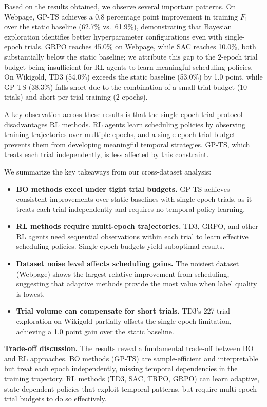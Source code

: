 \documentclass[11pt]{article}
\begin{document}
Based on the results obtained, we observe several important patterns. On Webpage, GP-TS achieves a 0.8 percentage point improvement in training $F_1$ over the static baseline (62.7\% vs.\ 61.9\%), demonstrating that Bayesian exploration identifies better hyperparameter configurations even with single-epoch trials. GRPO reaches 45.0\% on Webpage, while SAC reaches 10.0\%, both substantially below the static baseline; we attribute this gap to the 2-epoch trial budget being insufficient for RL agents to learn meaningful scheduling policies. On Wikigold, TD3 (54.0\%) exceeds the static baseline (53.0\%) by 1.0 point, while GP-TS (38.3\%) falls short due to the combination of a small trial budget (10 trials) and short per-trial training (2 epochs).

A key observation across these results is that the single-epoch trial protocol disadvantages RL methods. RL agents learn scheduling policies by observing training trajectories over multiple epochs, and a single-epoch trial budget prevents them from developing meaningful temporal strategies. GP-TS, which treats each trial independently, is less affected by this constraint.

We summarize the key takeaways from our cross-dataset analysis:

\begin{itemize}
    \item \textbf{BO methods excel under tight trial budgets.} GP-TS achieves consistent improvements over static baselines with single-epoch trials, as it treats each trial independently and requires no temporal policy learning.
    \item \textbf{RL methods require multi-epoch trajectories.} TD3, GRPO, and other RL agents need sequential observations within each trial to learn effective scheduling policies. Single-epoch budgets yield suboptimal results.
    \item \textbf{Dataset noise level affects scheduling gains.} The noisiest dataset (Webpage) shows the largest relative improvement from scheduling, suggesting that adaptive methods provide the most value when label quality is lowest.
    \item \textbf{Trial volume can compensate for short trials.} TD3's 227-trial exploration on Wikigold partially offsets the single-epoch limitation, achieving a 1.0 point gain over the static baseline.
\end{itemize}

\textbf{Trade-off discussion.} The results reveal a fundamental trade-off between BO and RL approaches. BO methods (GP-TS) are sample-efficient and interpretable but treat each epoch independently, missing temporal dependencies in the training trajectory. RL methods (TD3, SAC, TRPO, GRPO) can learn adaptive, state-dependent policies that exploit temporal patterns, but require multi-epoch trial budgets to do so effectively.
\end{document}
